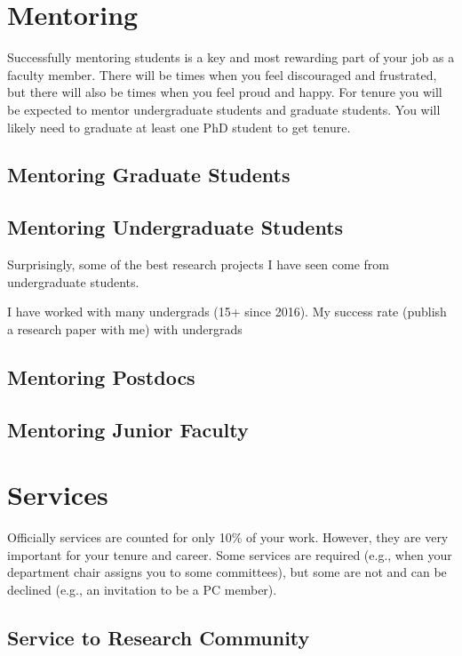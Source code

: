 \documentclass[oneside,11pt,dvipsnames]{book}
\begin{document}
\chapter{Mentoring}

Successfully mentoring students is a key and most rewarding part of your job as a faculty member. 
There will be times when you feel discouraged and frustrated, but there will also be times when you feel proud and happy.  
For tenure you will be expected to mentor undergraduate students and graduate students. You will likely need to graduate at least one PhD student to get tenure.

\section{Mentoring Graduate Students}


\section{Mentoring Undergraduate Students}
Surprisingly, some of the best research projects I have seen come from undergraduate students.  


I have worked with many undergrads (15+ since 2016). My success rate (publish a research paper with me) with undergrads 


\section{Mentoring Postdocs}
\section{Mentoring Junior Faculty}

\chapter{Services}\label{sec:services}


Officially services are counted for only 10\% of your work. However, they are very important for your tenure and career.
Some services are required (e.g., when your department chair assigns you to some committees), but some are not and can be declined (e.g., an invitation to be a PC member).  


\section{Service to Research Community}
\end{document}
